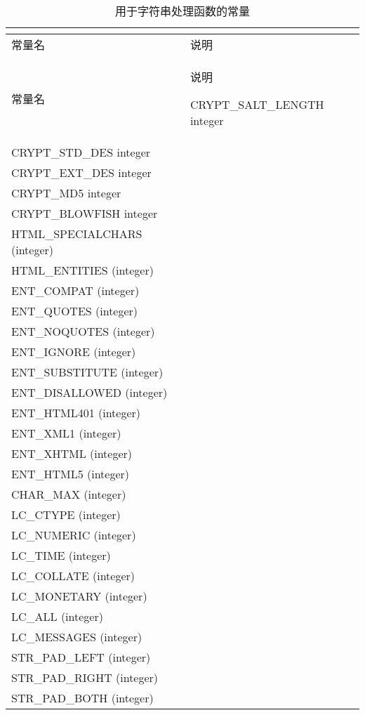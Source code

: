 \begin{longtable}{|m{100pt}|m{300pt}|}
\multicolumn{2}{r}{}
\tabularnewline\hline
常量名&说明
\endhead

\caption{用于字符串处理函数的常量}\\
\hline
常量名&说明
\endfirsthead

\multicolumn{2}{r}{}
\endfoot

\endlastfoot
\hline
CRYPT\_SALT\_LENGTH integer &\\
\hline
CRYPT\_STD\_DES integer&\\
\hline
CRYPT\_EXT\_DES integer&\\
\hline
CRYPT\_MD5 integer&\\
\hline
CRYPT\_BLOWFISH integer&\\
\hline
HTML\_SPECIALCHARS (integer)&\\
\hline
HTML\_ENTITIES (integer)&\\
\hline
ENT\_COMPAT (integer)&\\
\hline
ENT\_QUOTES (integer)&\\
\hline
ENT\_NOQUOTES (integer)&\\
\hline
ENT\_IGNORE (integer)&\\
\hline
ENT\_SUBSTITUTE (integer)&\\
\hline
ENT\_DISALLOWED (integer)&\\
\hline
ENT\_HTML401 (integer)&\\
\hline
ENT\_XML1 (integer)&\\
\hline
ENT\_XHTML (integer)&\\
\hline
ENT\_HTML5 (integer)&\\
\hline
CHAR\_MAX (integer)&\\
\hline
LC\_CTYPE (integer)&\\
\hline
LC\_NUMERIC (integer)&\\
\hline
LC\_TIME (integer)&\\
\hline
LC\_COLLATE (integer)&\\
\hline
LC\_MONETARY (integer)&\\
\hline
LC\_ALL (integer)&\\
\hline
LC\_MESSAGES (integer)&\\
\hline
STR\_PAD\_LEFT (integer)&\\
\hline
STR\_PAD\_RIGHT (integer)&\\
\hline
STR\_PAD\_BOTH (integer)&\\
\hline
\end{longtable}



